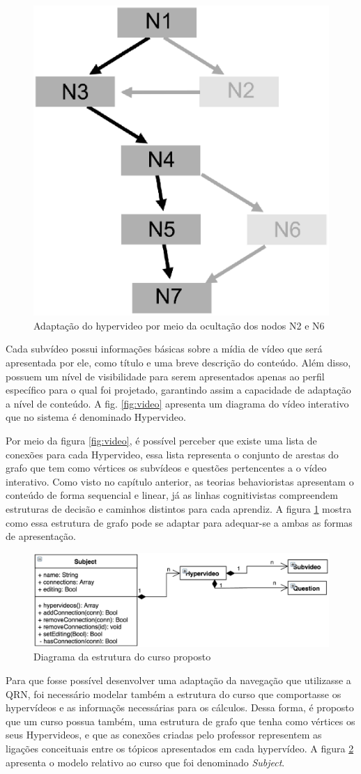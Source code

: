 \begin{figure}[h!]
	\centering
  	\includegraphics[width=.3\linewidth]{figuras/estrutura.eps}
  	\caption{Adaptação do hypervideo por meio da ocultação dos nodos N2 e N6}
  	\label{fig:estrutura}
\end{figure}

Cada subvídeo possui informações básicas sobre a mídia de vídeo que será apresentada por ele, como título e uma breve descrição do conteúdo. Além disso, possuem um nível de visibilidade para serem apresentados apenas ao perfil específico para o qual foi projetado, garantindo assim a capacidade de adaptação a nível de conteúdo. A fig. \ref{fig:video} apresenta um diagrama do vídeo interativo que no sistema é denominado Hypervideo.

Por meio da figura \ref{fig:video}, é possível perceber que existe uma lista de conexões para cada Hypervideo, essa lista representa o conjunto de arestas do grafo que tem como vértices os subvídeos e questões pertencentes a o vídeo interativo. Como visto no capítulo anterior, as teorias behavioristas apresentam o conteúdo de forma sequencial e linear, já as linhas cognitivistas compreendem estruturas de decisão e caminhos distintos para cada aprendiz. A figura \ref{fig:estrutura} mostra como essa estrutura de grafo pode se adaptar para adequar-se a ambas as formas de apresentação.

\begin{figure}[h!]
	\centering
  	\includegraphics[width=.7\linewidth]{figuras/curso.eps}
  	\caption{Diagrama da estrutura do curso proposto}
  	\label{fig:curso}
\end{figure}

Para que fosse possível desenvolver uma adaptação da navegação que utilizasse a QRN, foi necessário modelar também a estrutura do curso que comportasse os hypervídeos e as informaçõs necessárias para os cálculos. Dessa forma, é proposto que um curso possua também, uma estrutura de grafo que tenha como vértices os seus Hypervideos, e que as conexões criadas pelo professor representem as ligações conceituais entre os tópicos apresentados em cada hypervídeo. A figura \ref{fig:curso} apresenta o modelo relativo ao curso que foi denominado \textit{Subject}.

